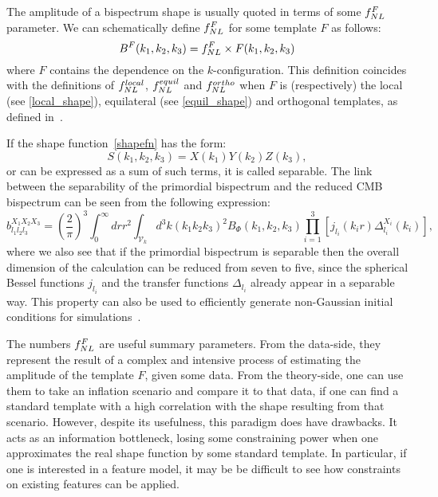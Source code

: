 The amplitude of a bispectrum shape is usually
quoted in terms of some $f_{NL}^F$ parameter.
We can schematically define $f_{NL}^F$ for some template $F$ as follows:
\begin{equation}\label{def:fnl}
{
B^{F}(k_1,k_2,k_3) = f_{NL}^{F}\times F(k_1,k_2,k_3)
}
\end{equation}
where $F$ contains the dependence on the $k$-configuration.
This definition coincides with the definitions of
$f^{local}_{NL}$, $f^{equil}_{NL}$ and $f^{ortho}_{NL}$
when $F$ is (respectively) the local (see \eqref{local_shape}),
equilateral (see \eqref{equil_shape}) and orthogonal templates,
as defined in~\cite{Planck_NG_2015}.

If the shape function~\eqref{shapefn} has the form:
\begin{equation}\label{sepXYZ}
S(k_1,k_2,k_3) = X(k_1)Y(k_2)Z(k_3),
\end{equation}
or can be expressed as a sum of such terms,
it is called separable.
The link between the separability of the primordial bispectrum
and the reduced CMB bispectrum can be seen from the following expression:
\begin{equation}
\label{eq:reduced_cmb}
b^{X_1X_2X_3}_{l_1l_2l_3} = \left(\frac{2}{\pi}\right)^3\int_{0}^{\infty}drr^2\int_{\mathcal{V}_k}d^3k (k_1k_2k_3)^2 B_{\Phi}(k_1,k_2,k_3)\prod_{i=1}^{3}\left[j_{l_i}(k_ir)\Delta^{X_i}_{l_i}(k_i)\right],
\end{equation}
where we also see that if the primordial bispectrum is separable
then the overall dimension
of the calculation can be reduced from seven to five, 
since the spherical Bessel functions $j_{l_i}$ and the
transfer functions $\Delta_{l_i}$ already appear in a separable way.
This property can also be used to
efficiently generate non-Gaussian initial conditions
for simulations~\cite{Scoccimarro_2012}.


The numbers $f_{NL}^F$ are useful summary parameters.
From the data-side, they represent the result of
a complex and intensive process
of estimating the amplitude of the template $F$,
given some data. From the theory-side, one
can use them to take an inflation scenario and compare it
to that data, if one can find a standard template
with a high correlation with the shape resulting
from that scenario.
However, despite its usefulness, this paradigm does
have drawbacks. It acts as an information bottleneck,
losing some constraining power when one approximates
the real shape function by some standard template.
In particular, if one is interested in a feature model,
it may be be difficult to see how constraints on existing
features can be applied.
\newpage
